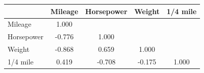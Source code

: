 \begin{tabular}{l*{4}{c}}
\doublerule
&Mileage & Horsepower & Weight & 1/4 mile \\
\midrule
Mileage         &    1.000&&&\\
Horsepower      &   -0.776&    1.000&&\\
Weight          &   -0.868&    0.659&    1.000&\\
1/4 mile        &    0.419&   -0.708&   -0.175&    1.000\\
\midrule
\end{tabular}
